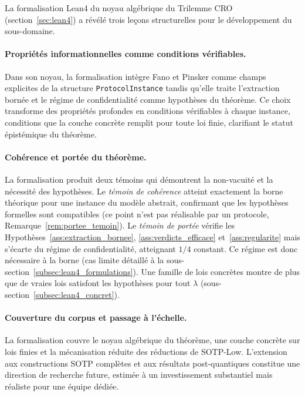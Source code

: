 \begin{sloppypar}
La formalisation Lean4 du noyau alg\'ebrique du Trilemme CRO
(section~\ref{sec:lean4}) a r\'ev\'el\'e trois le\c{c}ons structurelles pour
le d\'eveloppement du sous-domaine.

\paragraph{Propri\'et\'es informationnelles comme conditions v\'erifiables.}
Dans son noyau, la formalisation int\`egre Fano et Pinsker comme champs explicites de la
structure \texttt{ProtocolInstance} tandis qu'elle traite l'extraction born\'ee et le r\'egime de
confidentialit\'e comme hypoth\`eses du th\'eor\`eme. Ce choix transforme des
propri\'et\'es profondes en conditions v\'erifiables \`a chaque instance,
conditions que la couche concr\`ete remplit pour toute loi finie,
clarifiant le statut \'epist\'emique du th\'eor\`eme.

\paragraph{Coh\'erence et port\'ee du th\'eor\`eme.}
La formalisation produit deux t\'emoins qui d\'emontrent la non-vacuit\'e et
la n\'ecessit\'e des hypoth\`eses. Le \emph{t\'emoin de coh\'erence} atteint
exactement la borne th\'eorique pour une instance du mod\`ele abstrait,
confirmant que les hypoth\`eses formelles sont compatibles (ce point n'est
pas r\'ealisable par un protocole, Remarque~\ref{rem:portee_temoin}). Le \emph{t\'emoin de port\'ee} v\'erifie
les Hypoth\`eses~\ref{ass:extraction_bornee}, \ref{ass:verdicts_efficace} et~\ref{ass:regularite} mais s'\'ecarte du r\'egime de confidentialit\'e,
atteignant $1/4$ constant. Ce r\'egime est donc n\'ecessaire
\`a la borne (cas limite d\'etaill\'e \`a la
sous-section~\ref{subsec:lean4_formulations}). Une famille de lois concr\`etes montre de plus
que de vraies lois satisfont les hypoth\`eses pour tout $\lambda$
(sous-section~\ref{subsec:lean4_concret}).

\paragraph{Couverture du corpus et passage \`a l'\'echelle.}
La formalisation couvre le noyau alg\'ebrique du th\'eor\`eme, une couche concr\`ete sur
lois finies et la m\'ecanisation r\'eduite des r\'eductions de SOTP-Low.
L'extension aux constructions SOTP compl\`etes et aux r\'esultats
post-quantiques constitue une direction de recherche future, estim\'ee \`a
un investissement substantiel mais r\'ealiste pour une \'equipe d\'edi\'ee.


\end{sloppypar}
